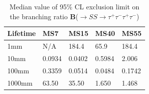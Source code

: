 \begin{table}[htb]
\centering
\begin{tabular}{|p{3cm}|p{1cm}|p{1cm}|p{1cm}|p{1cm}|}
\hline
Lifetime & MS7 & MS15&MS40&MS55 \\
\hline
1mm & N/A & 184.4 & 65.9 & 184.4   \\
\hline
10mm & 0.0934 & 0.0402 & 0.5984 & 2.006  \\
\hline
100mm & 0.3359& 0.0514 & 0.0484 & 0.1742 \\
\hline
1000mm & 63.50 & 35.50 & 1.650  & 1.468   \\
\hline
\end{tabular}
\label{tab:Median Limit}
\centering
\caption{Median value of 95\% CL exclusion limit on the branching ratio \textbf{B}(\PH$\to SS \to \tau^{+}\tau^{-}\tau^{+}\tau^{-} $) }
\end{table}





